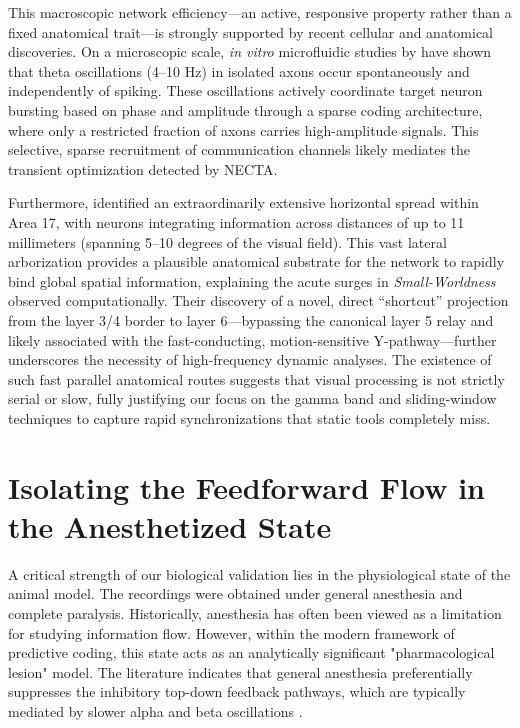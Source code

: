 This macroscopic network efficiency---an active, responsive property rather than a fixed anatomical trait---is strongly supported by recent cellular and anatomical discoveries. On a microscopic scale, \textit{in vitro} microfluidic studies by \cite{Lassers2026} have shown that theta oscillations (4--10 Hz) in isolated axons occur spontaneously and independently of spiking. These oscillations actively coordinate target neuron bursting based on phase and amplitude through a sparse coding architecture, where only a restricted fraction of axons carries high-amplitude signals. This selective, sparse recruitment of communication channels likely mediates the transient optimization detected by NECTA.

Furthermore, \cite{Martin_2024} identified an extraordinarily extensive horizontal spread within Area 17, with neurons integrating information across distances of up to 11 millimeters (spanning 5--10 degrees of the visual field). This vast lateral arborization provides a plausible anatomical substrate for the network to rapidly bind global spatial information, explaining the acute surges in \textit{Small-Worldness} observed computationally. Their discovery of a novel, direct ``shortcut'' projection from the layer 3/4 border to layer 6---bypassing the canonical layer 5 relay and likely associated with the fast-conducting, motion-sensitive Y-pathway---further underscores the necessity of high-frequency dynamic analyses. The existence of such fast parallel anatomical routes suggests that visual processing is not strictly serial or slow, fully justifying our focus on the gamma band and sliding-window techniques to capture rapid synchronizations that static tools completely miss.

\section{Isolating the Feedforward Flow in the Anesthetized State}
A critical strength of our biological validation lies in the physiological state of the animal model. The recordings were obtained under general anesthesia and complete paralysis. Historically, anesthesia has often been viewed as a limitation for studying information flow. However, within the modern framework of predictive coding, this state acts as an analytically significant "pharmacological lesion" model. The literature indicates that general anesthesia preferentially suppresses the inhibitory top-down feedback pathways, which are typically mediated by slower alpha and beta oscillations \cite{vezoli2021}. 

